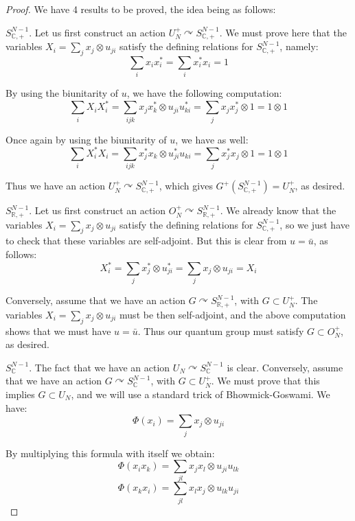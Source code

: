 \documentclass[12pt]{amsbook}
\begin{document}
\begin{proof}
We have 4 results to be proved, the idea being as follows:

\medskip

\underline{$S^{N-1}_{\mathbb C,+}$}. Let us first construct an action $U_N^+\curvearrowright S^{N-1}_{\mathbb C,+}$. We must prove here that the variables $X_i=\sum_jx_j\otimes u_{ji}$ satisfy the defining relations for $S^{N-1}_{\mathbb C,+}$, namely:
$$\sum_ix_ix_i^*=\sum_ix_i^*x_i=1$$

By using the biunitarity of $u$, we have the following computation:
$$\sum_iX_iX_i^*
=\sum_{ijk}x_jx_k^*\otimes u_{ji}u_{ki}^*
=\sum_jx_jx_j^*\otimes1
=1\otimes1$$

Once again by using the biunitarity of $u$, we have as well:
$$\sum_iX_i^*X_i
=\sum_{ijk}x_j^*x_k\otimes u_{ji}^*u_{ki}
=\sum_jx_j^*x_j\otimes1
=1\otimes1$$

Thus we have an action $U_N^+\curvearrowright S^{N-1}_{\mathbb C,+}$, which gives $G^+(S^{N-1}_{\mathbb C,+})=U_N^+$, as desired. 

\medskip

\underline{$S^{N-1}_{\mathbb R,+}$}. Let us first construct an action $O_N^+\curvearrowright S^{N-1}_{\mathbb R,+}$. We already know that the variables $X_i=\sum_jx_j\otimes u_{ji}$ satisfy the defining relations for $S^{N-1}_{\mathbb C,+}$, so we just have to check that these variables are self-adjoint. But this is clear from $u=\bar{u}$, as follows:
$$X_i^*
=\sum_jx_j^*\otimes u_{ji}^*
=\sum_jx_j\otimes u_{ji}
=X_i$$

Conversely, assume that we have an action $G\curvearrowright S^{N-1}_{\mathbb R,+}$, with $G\subset U_N^+$. The variables $X_i=\sum_jx_j\otimes u_{ji}$ must be then self-adjoint, and the above computation shows that we must have $u=\bar{u}$. Thus our quantum group must satisfy $G\subset O_N^+$, as desired.

\medskip

\underline{$S^{N-1}_\mathbb C$}. The fact that we have an action $U_N\curvearrowright S^{N-1}_\mathbb C$ is clear. Conversely, assume that we have an action $G\curvearrowright S^{N-1}_\mathbb C$, with $G\subset U_N^+$. We must prove that this implies $G\subset U_N$, and we will use a standard trick of Bhowmick-Goswami. We have:
$$\Phi(x_i)=\sum_jx_j\otimes u_{ji}$$

By multiplying this formula with itself we obtain:
$$\Phi(x_ix_k)=\sum_{jl}x_jx_l\otimes u_{ji}u_{lk}$$
$$\Phi(x_kx_i)=\sum_{jl}x_lx_j\otimes u_{lk}u_{ji}$$


\end{proof}
\end{document}

